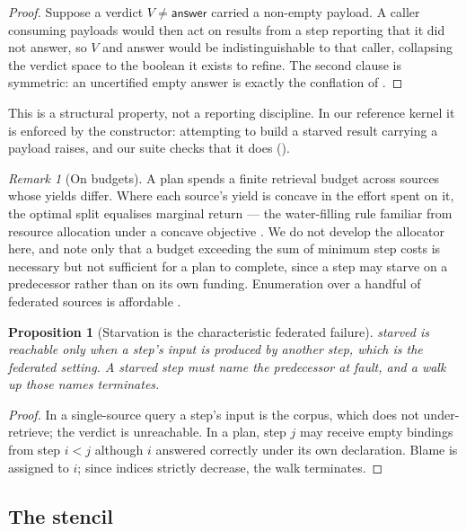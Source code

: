 \documentclass[11pt,twocolumn,a4paper]{article}
\theoremstyle{thmstyle}
\newtheorem{proposition}[theorem]{Proposition}
\theoremstyle{definition}
\theoremstyle{remark}
\newtheorem{remark}[theorem]{Remark}
\newcommand{\vans}{\textsf{answer}}
\newcommand{\vstarve}{\textsf{starved}}
\begin{document}
\begin{proof}
Suppose a verdict $V \neq \vans$ carried a non-empty payload. A caller
consuming payloads would then act on results from a step reporting that it did
not answer, so $V$ and \vans{} would be indistinguishable to that caller,
collapsing the verdict space to the boolean it exists to refine. The second
clause is symmetric: an uncertified empty \vans{} is exactly the conflation of
.
\end{proof}

This is a structural property, not a reporting discipline. In our reference
kernel it is enforced by the constructor: attempting to build a \vstarve{}
result carrying a payload raises, and our suite checks that it does
().

\begin{remark}[On budgets]
\label{rem:budget}
A plan spends a finite retrieval budget across sources whose yields differ.
Where each source's yield is concave in the effort spent on it, the optimal
split equalises marginal return --- the water-filling rule familiar from
resource allocation under a concave objective \citep{boyd2004}. We do not
develop the allocator here, and note only that a budget exceeding the sum of
minimum step costs is necessary but not sufficient for a plan to complete,
since a step may starve on a predecessor rather than on its own funding.
Enumeration over a handful of federated sources is affordable
\citep{cormen2009}.
\end{remark}

\begin{proposition}[Starvation is the characteristic federated failure]
\label{prop:starve}
\vstarve{} is reachable only when a step's input is produced by another step,
which is the federated setting. A starved step must name the predecessor at
fault, and a walk up those names terminates.
\end{proposition}

\begin{proof}
In a single-source query a step's input is the corpus, which does not
under-retrieve; the verdict is unreachable. In a plan, step $j$ may receive
empty bindings from step $i<j$ although $i$ answered correctly under its own
declaration. Blame is assigned to $i$; since indices strictly decrease, the
walk terminates.
\end{proof}

\subsection{The stencil}
\end{document}
